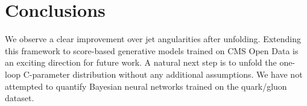 \section{Conclusions}\label{sec:conclusions}

We observe a clear improvement over jet angularities after unfolding.
Extending this framework to score-based generative models trained on CMS
Open Data is an exciting direction for future work. A natural next step
is to unfold the one-loop C-parameter distribution without any
additional assumptions. We have not attempted to quantify Bayesian
neural networks trained on the quark/gluon dataset.

